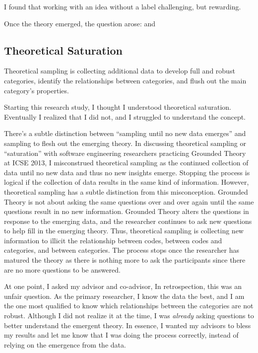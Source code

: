 I found that working with an idea without a label challenging, but rewarding. 

Once the theory emerged, the question arose:  and 
\subsection{Theoretical Saturation}
Theoretical sampling is collecting additional data to develop full and robust categories, identify the relationships between categories, and flush out the main category’s properties.

Starting this research study, I thought I understood theoretical saturation. Eventually I realized that I did not, and I struggled to understand the concept. 

There’s a subtle distinction between “sampling until no new data emerges” and sampling to flesh out the emerging theory. In discussing theoretical sampling or “saturation” with software engineering researchers practicing Grounded Theory at ICSE 2013, I misconstrued theoretical sampling as the continued collection of data until no new data and thus no new insights emerge. Stopping the process is logical if the collection of data results in the same kind of information. However, theoretical sampling has a subtle distinction from this misconception. Grounded Theory is not about asking the same questions over and over again until the same questions result in no new information. Grounded Theory alters the questions in response to the emerging data, and the researcher continues to ask new questions to help fill in the emerging theory. Thus, theoretical sampling is collecting new information to illicit the relationship between codes, between codes and categories, and between categories. The process stops once the researcher has matured the theory as there is nothing more to ask the participants since there are no more questions to be answered.

At one point, I asked my advisor and co-advisor,  In retrospection, this was an unfair question. As the primary researcher, I know the data the best, and I am the one most qualified to know which relationships between the categories are not robust. Although I did not realize it at the time, I was \textit{already} asking questions to better understand the emergent theory. In essence, I wanted my advisors to bless my results and let me know that I was doing the process correctly, instead of relying on the emergence from the data.

